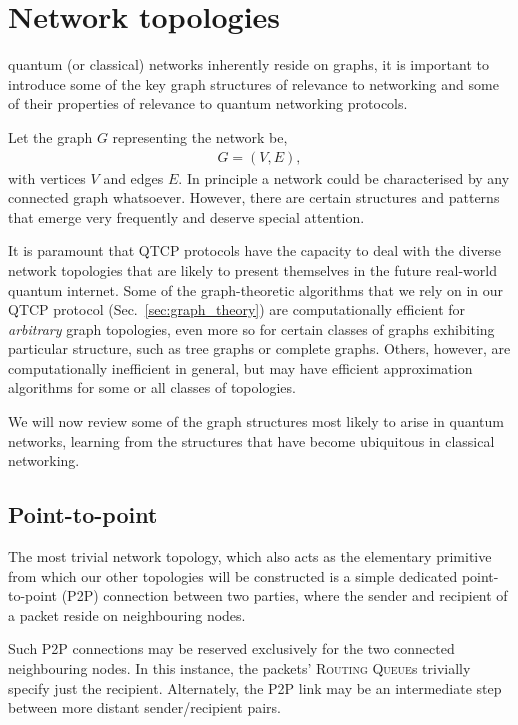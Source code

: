 %
%

\section{Network topologies} \label{sec:network_topologies}

 quantum (or classical) networks inherently reside on graphs, it is important to introduce some of the key graph structures of relevance to networking and some of their properties of relevance to quantum networking protocols.

Let the graph $G$ representing the network be,
\begin{align}
G=(V,E),	
\end{align}
with vertices $V$ and edges $E$. In principle a network could be characterised by any connected graph whatsoever. However, there are certain structures and patterns that emerge very frequently and deserve special attention.

It is paramount that QTCP protocols have the capacity to deal with the diverse network topologies that are likely to present themselves in the future real-world quantum internet. Some of the graph-theoretic algorithms that we rely on in our QTCP protocol (Sec.~\ref{sec:graph_theory}) are computationally efficient for \textit{arbitrary} graph topologies, even more so for certain classes of graphs exhibiting particular structure, such as tree graphs or complete graphs. Others, however, are computationally inefficient in general, but may have efficient approximation algorithms for some or all classes of topologies.

We will now review some of the graph structures most likely to arise in quantum networks, learning from the structures that have become ubiquitous in classical networking.

%
%

\subsection{Point-to-point} 

The most trivial network topology, which also acts as the elementary primitive from which our other topologies will be constructed is a simple dedicated point-to-point (P2P) connection between two parties, where the sender and recipient of a packet reside on neighbouring nodes.

Such P2P connections may be reserved exclusively for the two connected neighbouring nodes. In this instance, the packets' \textsc{Routing Queue}s trivially specify just the recipient. Alternately, the P2P link may be an intermediate step between more distant sender/recipient pairs.

